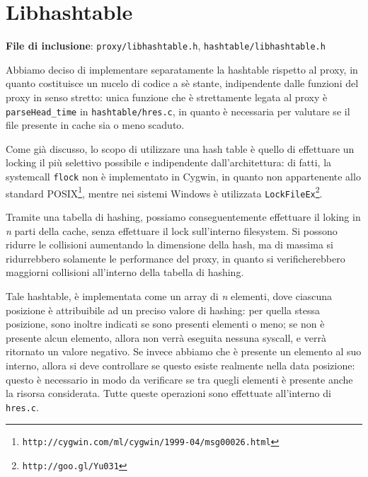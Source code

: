 \chapter{Libhashtable}\label{cha:lht}
\begin{itemize}
\diam \textbf{File di inclusione}: \texttt{proxy/libhashtable.h}, \texttt{hashtable/libhashtable.h} 
\end{itemize}
Abbiamo deciso di implementare separatamente la hashtable rispetto al proxy, in
quanto costituisce un nucelo di codice a sè stante, indipendente dalle funzioni
del proxy in senso stretto: unica funzione che è strettamente legata al proxy è
\texttt{parseHead\_time} in \texttt{hashtable/hres.c}, in quanto è necessaria per 
valutare se il file presente in cache sia o meno scaduto.

Come già discusso, lo scopo di utilizzare una hash table è quello di effettuare 
un locking il più selettivo possibile e indipendente dall'architettura: di fatti,
la systemcall \texttt{flock} non è implementato in Cygwin, in quanto non appartenente
allo standard POSIX\footnote{\texttt{http://cygwin.com/ml/cygwin/1999-04/msg00026.html}},
mentre nei sistemi Windows è utilizzata \texttt{LockFileEx}\footnote{
\texttt{http://goo.gl/Yu031}}.

Tramite una tabella di hashing, possiamo conseguentemente effettuare il loking
in \textit{n} parti della cache, senza effettuare il lock sull'interno filesystem.
Si possono ridurre le collisioni aumentando la dimensione della hash, ma di 
massima si ridurrebbero solamente le performance del proxy, in quanto si 
verificherebbero maggiorni collisioni all'interno della tabella di hashing.

Tale hashtable, è implementata come un array di \textit{n} elementi, dove ciascuna
posizione è attribuibile ad un preciso valore di hashing: per quella stessa
posizione, sono inoltre indicati se sono presenti elementi o meno; se non è
presente alcun elemento, allora non verrà eseguita nessuna syscall, e verrà
ritornato un valore negativo. Se invece abbiamo che è presente un elemento al
suo interno, allora si deve controllare se questo esiste realmente nella data
posizione: questo è necessario in modo da verificare se tra quegli elementi è
presente anche la risorsa considerata. Tutte queste operazioni sono effettuate
all'interno di \texttt{hres.c}.

